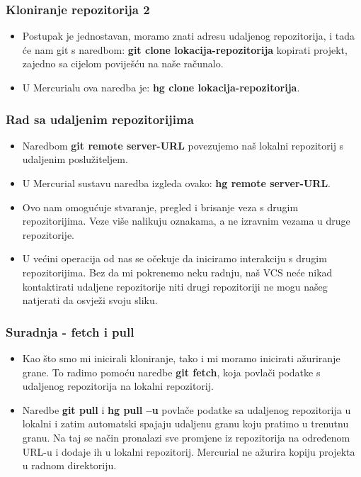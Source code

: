 \documentclass{beamer}
\begin{document}
	\begin{frame}
		\frametitle{Kloniranje repozitorija 2}
		\begin{itemize}
			\item Postupak je jednostavan, moramo znati adresu udaljenog repozitorija, i tada će nam git s naredbom: \textbf{git clone lokacija-repozitorija} kopirati projekt, zajedno sa cijelom poviješću na naše računalo.
			\item U Mercurialu ova naredba je: \textbf{hg clone lokacija-repozitorija}.
		\end{itemize}
	\end{frame}

	\begin{frame}
		\frametitle{Rad sa udaljenim repozitorijima}
		\begin{itemize}
			\item Naredbom \textbf{git remote server-URL} povezujemo naš lokalni repozitorij s udaljenim poslužiteljem.
			\item U Mercurial sustavu naredba izgleda ovako: \textbf{hg remote server-URL}.
			\item  Ovo nam omogućuje stvaranje, pregled i brisanje veza s drugim repozitorijima. Veze više nalikuju oznakama, a ne izravnim vezama u druge repozitorije.
			\item U većini operacija od nas se očekuje da iniciramo interakciju s drugim repozitorijima. Bez da mi pokrenemo neku radnju, naš VCS neće nikad kontaktirati udaljene repozitorije niti drugi repozitoriji ne mogu našeg natjerati da osvježi svoju sliku. 
		\end{itemize}
	\end{frame}

	\begin{frame}
		\frametitle{Suradnja - fetch i pull}
		\begin{itemize}
			\item Kao što smo mi inicirali kloniranje, tako i mi moramo inicirati ažuriranje grane. To radimo pomoću naredbe \textbf{git fetch}, koja povlači podatke s udaljenog repozitorija na lokalni repozitorij.
			\item Naredbe \textbf{git pull} i \textbf{hg pull –u} povlače podatke sa udaljenog repozitorija u lokalni i zatim automatski spajaju udaljenu granu koju pratimo u trenutnu granu. Na taj se način pronalazi sve promjene iz repozitorija na određenom URL-u i dodaje ih u lokalni repozitorij. Mercurial ne ažurira kopiju projekta u radnom direktoriju. 
		\end{itemize}
	\end{frame}
\end{document}
